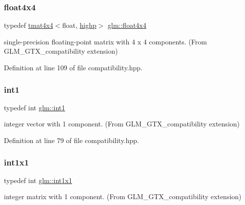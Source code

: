 \subsubsection{\texorpdfstring{float4x4}{float4x4}}
{\footnotesize\ttfamily typedef \mbox{\hyperlink{structglm_1_1tmat4x4}{tmat4x4}}$<$float, \mbox{\hyperlink{namespaceglm_a0f04f086094c747d227af4425893f545ac6f7eab42eacbb10d59a58e95e362074}{highp}}$>$ \mbox{\hyperlink{group__gtx__compatibility_ga67688a2f2fc6386544d1a47a5d430467}{glm\+::float4x4}}}



single-\/precision floating-\/point matrix with 4 x 4 components. (From G\+L\+M\+\_\+\+G\+T\+X\+\_\+compatibility extension) 



Definition at line 109 of file compatibility.\+hpp.

\mbox{\label{group__gtx__compatibility_gaba41d7803e4b24c17656d74377b88286}} 
\subsubsection{\texorpdfstring{int1}{int1}}
{\footnotesize\ttfamily typedef int \mbox{\hyperlink{group__gtx__compatibility_gaba41d7803e4b24c17656d74377b88286}{glm\+::int1}}}



integer vector with 1 component. (From G\+L\+M\+\_\+\+G\+T\+X\+\_\+compatibility extension) 



Definition at line 79 of file compatibility.\+hpp.

\mbox{\label{group__gtx__compatibility_ga09016a637a3cd093c22e6188080ac750}} 
\subsubsection{\texorpdfstring{int1x1}{int1x1}}
{\footnotesize\ttfamily typedef int \mbox{\hyperlink{group__gtx__compatibility_ga09016a637a3cd093c22e6188080ac750}{glm\+::int1x1}}}



integer matrix with 1 component. (From G\+L\+M\+\_\+\+G\+T\+X\+\_\+compatibility extension) 



